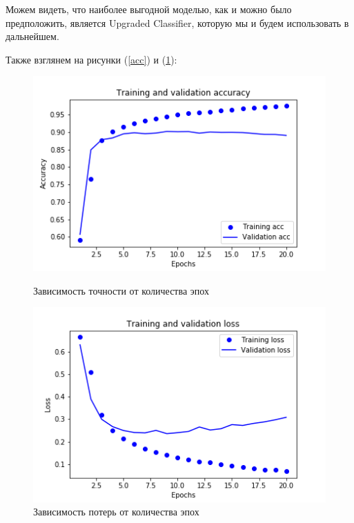 \documentclass[14pt]{matmex-diploma}
\begin{document}
        Можем видеть, что наиболее выгодной моделью, как и можно было предположить, является Upgraded Classifier, 
        которую мы и будем использовать в дальнейшем.
        
        Также взглянем на рисунки (\ref{acc}) и (\ref{loss}):
        
        \begin{figure}[!htb]
           \begin{minipage}{0.48\textwidth}
             \centering
             \includegraphics[width=.9\linewidth]{images/acc.png}
             \caption{Зависимость точности от количества эпох}\label{acc}
           \end{minipage}\hfill
           \begin{minipage}{0.48\textwidth}
             \centering
             \includegraphics[width=.9\linewidth]{images/loss.png}
             \caption{Зависимость потерь от количества эпох}\label{loss}
           \end{minipage}
        \end{figure}
        
\end{document}
